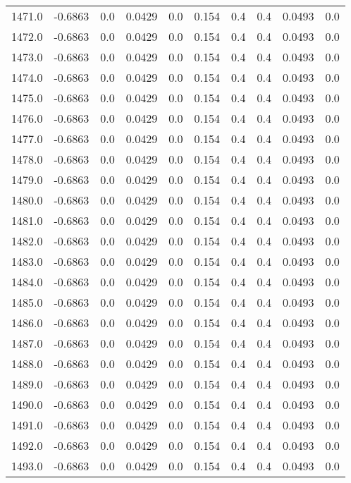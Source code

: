 \begin{longtable}{lrrrrrrrrr}
1471.0 & -0.6863 & 0.0 & 0.0429 & 0.0 & 0.154 & 0.4 & 0.4 & 0.0493 & 0.0 \\
1472.0 & -0.6863 & 0.0 & 0.0429 & 0.0 & 0.154 & 0.4 & 0.4 & 0.0493 & 0.0 \\
1473.0 & -0.6863 & 0.0 & 0.0429 & 0.0 & 0.154 & 0.4 & 0.4 & 0.0493 & 0.0 \\
1474.0 & -0.6863 & 0.0 & 0.0429 & 0.0 & 0.154 & 0.4 & 0.4 & 0.0493 & 0.0 \\
1475.0 & -0.6863 & 0.0 & 0.0429 & 0.0 & 0.154 & 0.4 & 0.4 & 0.0493 & 0.0 \\
1476.0 & -0.6863 & 0.0 & 0.0429 & 0.0 & 0.154 & 0.4 & 0.4 & 0.0493 & 0.0 \\
1477.0 & -0.6863 & 0.0 & 0.0429 & 0.0 & 0.154 & 0.4 & 0.4 & 0.0493 & 0.0 \\
1478.0 & -0.6863 & 0.0 & 0.0429 & 0.0 & 0.154 & 0.4 & 0.4 & 0.0493 & 0.0 \\
1479.0 & -0.6863 & 0.0 & 0.0429 & 0.0 & 0.154 & 0.4 & 0.4 & 0.0493 & 0.0 \\
1480.0 & -0.6863 & 0.0 & 0.0429 & 0.0 & 0.154 & 0.4 & 0.4 & 0.0493 & 0.0 \\
1481.0 & -0.6863 & 0.0 & 0.0429 & 0.0 & 0.154 & 0.4 & 0.4 & 0.0493 & 0.0 \\
1482.0 & -0.6863 & 0.0 & 0.0429 & 0.0 & 0.154 & 0.4 & 0.4 & 0.0493 & 0.0 \\
1483.0 & -0.6863 & 0.0 & 0.0429 & 0.0 & 0.154 & 0.4 & 0.4 & 0.0493 & 0.0 \\
1484.0 & -0.6863 & 0.0 & 0.0429 & 0.0 & 0.154 & 0.4 & 0.4 & 0.0493 & 0.0 \\
1485.0 & -0.6863 & 0.0 & 0.0429 & 0.0 & 0.154 & 0.4 & 0.4 & 0.0493 & 0.0 \\
1486.0 & -0.6863 & 0.0 & 0.0429 & 0.0 & 0.154 & 0.4 & 0.4 & 0.0493 & 0.0 \\
1487.0 & -0.6863 & 0.0 & 0.0429 & 0.0 & 0.154 & 0.4 & 0.4 & 0.0493 & 0.0 \\
1488.0 & -0.6863 & 0.0 & 0.0429 & 0.0 & 0.154 & 0.4 & 0.4 & 0.0493 & 0.0 \\
1489.0 & -0.6863 & 0.0 & 0.0429 & 0.0 & 0.154 & 0.4 & 0.4 & 0.0493 & 0.0 \\
1490.0 & -0.6863 & 0.0 & 0.0429 & 0.0 & 0.154 & 0.4 & 0.4 & 0.0493 & 0.0 \\
1491.0 & -0.6863 & 0.0 & 0.0429 & 0.0 & 0.154 & 0.4 & 0.4 & 0.0493 & 0.0 \\
1492.0 & -0.6863 & 0.0 & 0.0429 & 0.0 & 0.154 & 0.4 & 0.4 & 0.0493 & 0.0 \\
1493.0 & -0.6863 & 0.0 & 0.0429 & 0.0 & 0.154 & 0.4 & 0.4 & 0.0493 & 0.0 \\

\end{longtable}
